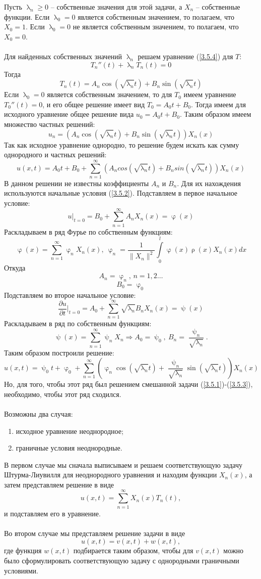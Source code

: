 \documentclass[a4paper, 12pt]{report}
\numberwithin{equation}{section}
\renewcommand{\geq}{\geqslant}
\renewcommand{\varphi}{\upvarphi}
\renewcommand{\lambda}{\uplambda}
\renewcommand{\psi}{\uppsi}
\renewcommand{\rho}{\uprho}
\newcommand{\pderiv}[2]{\dfrac{\partial #1}{\partial #2}}
\begin{document}
	Пусть $\lambda_n\geq 0$ -- собственные значения для этой задачи, а $X_n$ -- собственные функции.
	Если $\lambda_0=0$ является собственным значением, то полагаем, что $X_0=1$. Если $\lambda_0=0$ не является собственным значением, то полагаем, что $X_0=0$.\\\\
	Для найденных собственных значений $\lambda_n$ решаем уравнение (\ref{3.5.4}) для $T$:
	$$T_n''(t)+\lambda_nT_n(t)=0$$
	Тогда
	$$T_n(t)=A_n\cos\left(\sqrt{\lambda_n}t\right)+B_n\sin\left(\sqrt{\lambda_n}t\right)$$
	Если $\lambda_0=0$ является собственным значением, то для $T_0$ имеем уравнение $T_0''(t)=0$, и его общее решение имеет вид $T_0=A_0t+B_0$. Тогда имеем для исходного уравнение общее решение вида $u_0=A_0t+B_0$.
	Таким образом имеем множество частных решений:
	$$u_n=\left(A_n\cos\left(\sqrt{\lambda_n}t\right)+B_n\sin\left(\sqrt{\lambda_n}t\right)\right)X_n(x)$$
	Так как исходное уравнение однородно, то решение будем искать как сумму однородного и частных решений:
	$$u(x,t)=A_0t+B_0+\sum\limits_{n=1}^\infty\left(A_ncos\left(\sqrt{\lambda_n}t\right)+B_nsin\left(\sqrt{\lambda_n}t\right)\right)X_n(x)$$
	В данном решении не известны коэффициенты $A_n$ и $B_n$.
	Для их нахождения используются начальные условия (\ref{3.5.2}).
	Подставляем в первое начальное условие:
	$$u|_{t=0}=B_0+\sum\limits_{n=1}^\infty A_nX_n(x)=\varphi(x)$$
	Раскладываем в ряд Фурье по собственным функциям:
	$$\varphi(x) = \sum_{n=1}^\infty \varphi_n X_n(x),\ \varphi_n=\frac{1}{\|X_n\|^2}\int\limits_0^l\varphi(x)\rho(x)X_n(x)dx$$
	Откуда
	$$A_n=\varphi_n\text{, }n=1,2\dots$$
	$$B_0=\varphi_0$$
	Подставляем во второе начальное условие:
	$$\pderiv{u}{t}\Bigr|_{t=0}=A_0+\sum\limits_{n=1}^\infty \sqrt{\lambda_n}B_nX_n(x)=\psi(x)$$
	Раскладываем в ряд по собственным функциям:
	$$\psi(x)=\sum\limits_{n=1}^\infty \psi_nX_n\Rightarrow A_0=\psi_0,\  B_n=\frac{\psi_n}{\sqrt{\lambda_n}}.$$
	Таким образом построили решение:
	$$u(x,t)=\psi_0t+\varphi_0+\sum_{n=1}^\infty\left(\varphi_n\cos\left(\sqrt{\lambda_n}t\right)+\frac{\psi_n}{\sqrt{\lambda_n}}\sin\left(\sqrt{\lambda_n}t\right)\right)X_n(x)$$
	Но, для того, чтобы этот ряд был решением смешанной задачи (\ref{3.5.1})-(\ref{3.5.3}), необходимо, чтобы этот ряд сходился.\\\\
	Возможны два случая:
	\begin{enumerate}
		\item исходное уравнение неоднородное;
		\item граничные условия неоднородные.
	\end{enumerate}
	В первом случае мы сначала выписываем и решаем соответствующую задачу Штурма-Лиувилля для неоднородного уравнения и находим функции $X_n(x)$, а затем представляем решение в виде $$u(x,t) = \sum_{n=1}^\infty X_n(x)T_n(t),$$ и подставляем его в уравнение.
	\\\\
	Во втором случае мы представляем решение задачи в виде
	\begin{equation*}
		u(x,t) = v(x,t) + w(x,t),
	\end{equation*}
	где функция $w(x,t)$ подбирается таким образом, чтобы для $v(x,t)$ можно было сформулировать соответствующую задачу с однородными граничными условиями.
\end{document}
